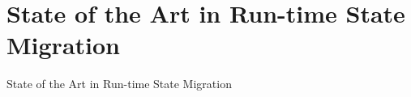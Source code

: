 \chapter{State of the Art in Run-time State Migration}
\label{ch:state_of_art}

State of the Art in Run-time State Migration
